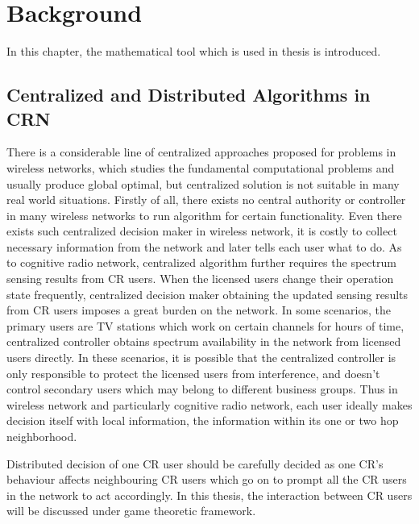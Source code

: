 \chapter{Background}

In this chapter, the mathematical tool which is used in thesis is introduced.

\section{Centralized and Distributed Algorithms in CRN}
\label{centralized_distributed}
There is a considerable line of centralized approaches proposed for problems in wireless networks, which studies the fundamental computational problems and usually produce global optimal, but centralized solution is not suitable in many real world situations.
Firstly of all, there exists no central authority or controller in many wireless networks to run algorithm for certain functionality.
Even there exists such centralized decision maker in wireless network, it is costly to collect necessary information from the network and later tells each user what to do.
As to cognitive radio network, centralized algorithm further requires the spectrum sensing results from CR users.
When the licensed users change their operation state frequently, centralized decision maker obtaining the updated sensing results from CR users imposes a great burden on the network.
In some scenarios, \eg the primary users are TV stations which work on certain channels for hours of time, centralized controller obtains spectrum availability in the network from licensed users directly.
In these scenarios, it is possible that the centralized controller is only responsible to protect the licensed users from interference, and doesn't control secondary users which may belong to different business groups.
Thus in wireless network and particularly cognitive radio network, each user ideally makes decision itself with local information, \ie the information within its one or two hop neighborhood.


Distributed decision of one CR user should be carefully decided as one CR's behaviour affects neighbouring CR users which go on to prompt all the CR users in the network to act accordingly.
In this thesis, the interaction between CR users will be discussed under game theoretic framework.

